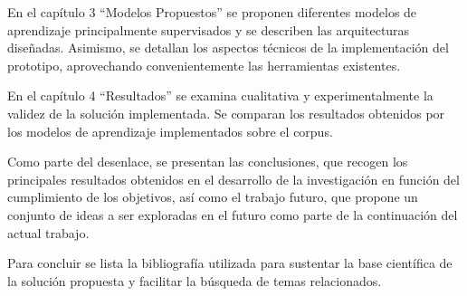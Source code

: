 En el capítulo 3 “Modelos Propuestos” se proponen diferentes modelos de aprendizaje principalmente supervisados y se describen las arquitecturas diseñadas. Asimismo, se
detallan los aspectos técnicos de la implementación del prototipo, aprovechando convenientemente las herramientas existentes.

En el capítulo 4 “Resultados” se examina cualitativa y experimentalmente la validez de la solución implementada. Se comparan los resultados obtenidos por los modelos de aprendizaje implementados sobre el corpus.

Como parte del desenlace, se presentan las conclusiones, que recogen los principales resultados obtenidos en el desarrollo de la investigación en función del cumplimiento de los objetivos, así como el trabajo futuro, que propone un conjunto de ideas a ser exploradas en el futuro como parte de la continuación del actual trabajo.

Para concluir se lista la bibliografía utilizada para sustentar la base científica de la solución propuesta y facilitar la búsqueda de temas relacionados.

